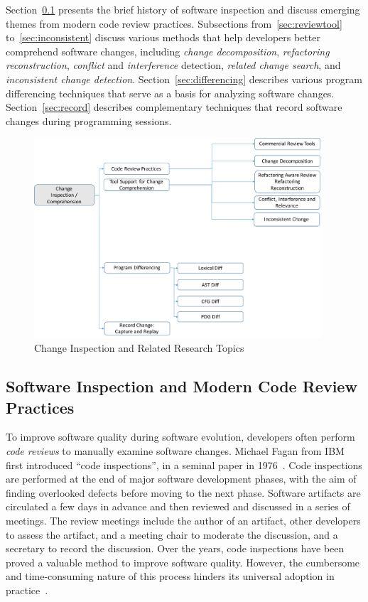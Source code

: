 
Section~\ref{sec:codereview} presents the brief history of software inspection and discuss emerging themes from modern code review practices. Subsections from~\ref{sec:reviewtool} to~\ref{sec:inconsistent} discuss various methods that help developers better comprehend software changes, including {\em change decomposition}, {\em refactoring reconstruction}, {\em conflict} and {\em interference} detection, {\em related change search}, and {\em inconsistent change detection}. Section~\ref{sec:differencing} describes various program differencing techniques that serve as a basis for analyzing software changes. Section~\ref{sec:record} describes complementary techniques that record software changes during programming sessions. 

\begin{figure}[ht]
 \centering
 \includegraphics[width=0.95\textwidth]{images/ChangeInspection.pdf}
 \caption{Change Inspection and Related Research Topics} 
 \label{fig:changeinspection} 
\end{figure}

\subsection{Software Inspection and Modern Code Review Practices} 
\label{sec:codereview}

To improve software quality during software evolution, developers often perform {\em code reviews} to manually examine software changes. Michael Fagan from IBM first introduced ``code inspections'', in a seminal paper in 1976~\cite{Fagan1999:checklist}. Code inspections are performed at the end of major software development phases, with the aim of finding overlooked defects before moving to the next phase. Software artifacts are circulated a few days in advance and then reviewed and discussed in a series of meetings. The review meetings include the author of an artifact, other developers to assess the artifact, and a meeting chair to moderate the discussion, and a secretary to record the discussion. Over the years, code inspections have been proved a valuable method to improve software quality. However, the cumbersome and time-consuming nature of this process hinders its universal adoption in practice~\cite{johnson1998reengineering}. 


